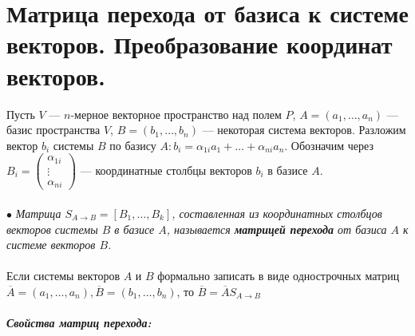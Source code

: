 \section{Матрица перехода от базиса к системе векторов. Преобразование координат векторов.}
Пусть $V$ --- $n$-мерное векторное пространство над полем $P$, $A=(a_{1}, \dots , a_{n})$ --- базис пространства $V$,  $B=(b_{1}, \dots ,b_{n})$ --- некоторая система векторов. Разложим вектор $b_i$ системы $B$ по базису $A: b_{i} = \alpha_{1i}a_{1} + \ldots + \alpha_{ni}a_{n}$. Обозначим через
$B_{i} = \begin{pmatrix} \alpha_{1i}
	\\ \vdots
	\\ \alpha_{ni}
\end{pmatrix}$ --- координатные столбцы векторов $b_i$ в базисе $A$.\\\\
$\bullet$\textit{ Матрица $S_{A\rightarrow B} = [B_{1}, \dots, B_{k}]$, составленная из координатных столбцов векторов системы $B$ в базисе $A$, называется \textbf{матрицей перехода} от базиса $A$ к системе векторов $B$.}\\\\
Если системы векторов $A$ и $B$ формально записать в виде однострочных матриц $\overline{A} = (a_1,\dots,a_n), \overline{B} = (b_1,\dots,b_n)$, то $\overline{B} = \overline{A}S_{A\rightarrow B}$\\\\
\textit{\textbf{Свойства матриц перехода:}}
